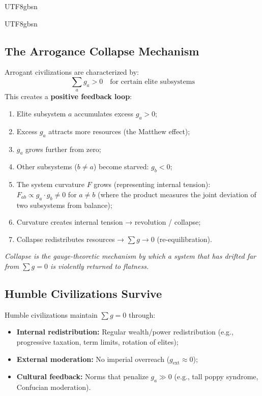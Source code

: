 \documentclass[11pt,a4paper]{article}
\begin{document}
\begin{CJK}{UTF8}{gbsn}
{\begin{CJK}{UTF8}{gbsn}
\subsection{The Arrogance Collapse Mechanism}
Arrogant civilizations are characterized by:
\begin{equation}
    \sum_a g_a > 0 \quad \text{for certain elite subsystems}
\end{equation}
This creates a \textbf{positive feedback loop}:
\begin{enumerate}[label=(\roman*)]
    \item Elite subsystem $a$ accumulates excess $g_a > 0$;
    \item Excess $g_a$ attracts more resources (the Matthew effect);
    \item $g_a$ grows further from zero;
    \item Other subsystems ($b \neq a$) become starved: $g_b < 0$;
    \item The system curvature $F$ grows (representing internal tension):
          $F_{ab} \propto g_a \cdot g_b \neq 0$ for $a \neq b$ (where the product
          measures the joint deviation of two subsystems from balance);
    \item Curvature creates internal tension → revolution / collapse;
    \item Collapse redistributes resources → $\sum g \to 0$ (re-equilibration).
\end{enumerate}
\textit{Collapse is the gauge-theoretic mechanism by which a system that has drifted
far from $\sum g = 0$ is violently returned to flatness.}
\subsection{Humble Civilizations Survive}
Humble civilizations maintain $\sum g = 0$ through:
\begin{itemize}
    \item \textbf{Internal redistribution:} Regular wealth/power redistribution
          (e.g., progressive taxation, term limits, rotation of elites);
    \item \textbf{External moderation:} No imperial overreach ($g_{\text{ext}} \approx 0$);
    \item \textbf{Cultural feedback:} Norms that penalize $g_a \gg 0$ (e.g.,
          tall poppy syndrome, Confucian moderation).
\end{itemize}

\end{CJK}}
\end{CJK}
\end{document}
